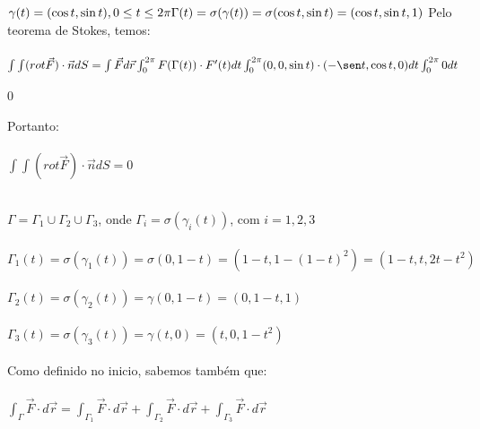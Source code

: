 \documentclass[11pt,a4paper]{article}
\begin{document}
\begin{enumerate}
{		        \item $\gamma(t)=(\cos t,\sin t),0\leq t \leq 2 \pi \\\\
		                \Gamma (t) = \sigma(\gamma (t))=\sigma(\cos t,\sin t)=(\cos t, \sin t,1)\\\\$
		                Pelo teorema de Stokes, temos: \\\\
		                $\int\int (rot \vec{F})\cdot \vec{n}dS = \int \vec{F} d\vec{r} \int_{0}^{2\pi} F(\Gamma (t))\cdot F'(t)dt \\\\
		                \int_{0}^{2\pi} (0,0,\sin t) \cdot (-\sen t, \cos t,0)dt \\\\
		                \int_{0}^{2\pi} 0dt $\\\\
                        $0$\\\\
                        Portanto: \\\\
                        $\int\int (rot \vec{F})\cdot \vec{n}dS = 0$
		                \\\\
		        \item  $\Gamma = \Gamma_{1} \cup \Gamma_{2} \cup \Gamma_{3}$, onde           $\Gamma_{i}=\sigma(\gamma_{i}(t))$, com $i=1,2,3$\\\\
		               $\Gamma_{1}(t) = \sigma(\gamma_{1}(t))
		               =\sigma(0,1-t)
		               =(1-t,1-(1-t)^2)
		               =(1-t,t,2t - t^2)$
		               \\\\
		               $\Gamma_{2}(t) = \sigma(\gamma_{2}(t))
		               =\gamma(0,1-t)
		               =(0,1-t,1)$
		               \\\\
		               $\Gamma_{3}(t) = \sigma(\gamma_{3}(t))
		               =\gamma(t,0)
		               =(t,0,1-t^2)$ \\\\
		               Como definido no inicio, sabemos também que:\\\\
		               $\int_{\Gamma} \vec{F} \cdot d\vec{r} = \int_{\Gamma_{1}} \vec{F} \cdot d\vec{r} + \int_{\Gamma_{2}} \vec{F} \cdot d\vec{r} + \int_{\Gamma_{3}} \vec{F} \cdot d\vec{r}$\\\\
}
\end{enumerate}
\end{document}
